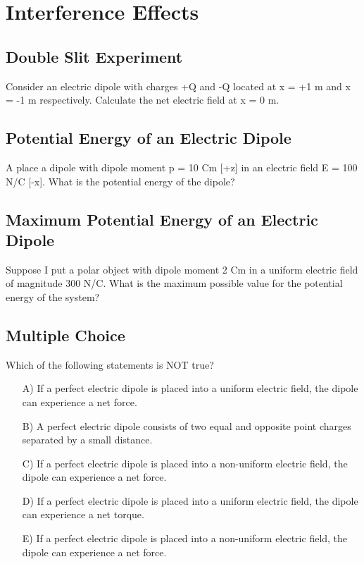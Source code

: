 \documentclass[11pt]{article}
\begin{document}


\pagebreak
\section{Interference Effects}

\subsection{Double Slit Experiment}
Consider an electric dipole with charges +Q and -Q located at x = +1 m and x = -1 m respectively.  Calculate the net electric field at x = 0 m.

\subsection{Potential Energy of an Electric Dipole}
A place a dipole with dipole moment p = 10 Cm [+z] in an electric field E = 100 N/C [-x].  What is the potential energy of the dipole?

\subsection{Maximum Potential Energy of an Electric Dipole}
Suppose I put a polar object with dipole moment 2 Cm in a uniform electric field of magnitude 300 N/C.  What is the maximum possible value for the potential energy of the system?

\subsection{Multiple Choice}
Which of the following statements is NOT true?

\begin{itemize}
	\item[A)] If a perfect electric dipole is placed into a uniform electric field, the dipole can experience a net force.
	\item[B)] A perfect electric dipole consists of two equal and opposite point charges separated by a small distance.
	\item[C)] If a perfect electric dipole is placed into a non-uniform electric field, the dipole can experience a net force.
	\item[D)] If a perfect electric dipole is placed into a uniform electric field, the dipole can experience a net torque.
	\item[E)] If a perfect electric dipole is placed into a non-uniform electric field, the dipole can experience a net force.
\end{itemize}
\end{document}
